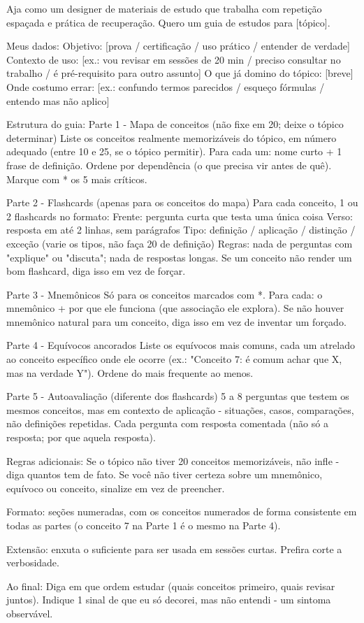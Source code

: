 \documentclass[11pt, a4paper]{article}
\begin{document}
\begin{promptbox}
Aja como um designer de materiais de estudo que trabalha com repetição espaçada e prática de recuperação. Quero um guia de estudos para [tópico].

Meus dados:
 Objetivo: [prova / certificação / uso prático / entender de verdade]
 Contexto de uso: [ex.: vou revisar em sessões de 20 min / preciso consultar no trabalho / é pré-requisito para outro assunto]
 O que já domino do tópico: [breve]
 Onde costumo errar: [ex.: confundo termos parecidos / esqueço fórmulas / entendo mas não aplico]

Estrutura do guia:
 Parte 1 - Mapa de conceitos (não fixe em 20; deixe o tópico determinar)
  Liste os conceitos realmente memorizáveis do tópico, em número adequado (entre 10 e 25, se o tópico permitir). Para cada um: nome curto + 1 frase de definição. Ordene por dependência (o que precisa vir antes de quê). Marque com * os 5 mais críticos.

 Parte 2 - Flashcards (apenas para os conceitos do mapa)
  Para cada conceito, 1 ou 2 flashcards no formato:
   Frente: pergunta curta que testa uma única coisa
   Verso: resposta em até 2 linhas, sem parágrafos
  Tipo: definição / aplicação / distinção / exceção (varie os tipos, não faça 20 de definição)
  Regras: nada de perguntas com "explique" ou "discuta"; nada de respostas longas. Se um conceito não render um bom flashcard, diga isso em vez de forçar.

 Parte 3 - Mnemônicos
  Só para os conceitos marcados com *. Para cada: o mnemônico + por que ele funciona (que associação ele explora). Se não houver mnemônico natural para um conceito, diga isso em vez de inventar um forçado.

 Parte 4 - Equívocos ancorados
  Liste os equívocos mais comuns, cada um atrelado ao conceito específico onde ele ocorre (ex.: "Conceito 7: é comum achar que X, mas na verdade Y"). Ordene do mais frequente ao menos.

 Parte 5 - Autoavaliação (diferente dos flashcards)
  5 a 8 perguntas que testem os mesmos conceitos, mas em contexto de aplicação - situações, casos, comparações, não definições repetidas. Cada pergunta com resposta comentada (não só a resposta; por que aquela resposta).

Regras adicionais:
 Se o tópico não tiver 20 conceitos memorizáveis, não infle - diga quantos tem de fato.
 Se você não tiver certeza sobre um mnemônico, equívoco ou conceito, sinalize em vez de preencher.

Formato: seções numeradas, com os conceitos numerados de forma consistente em todas as partes (o conceito 7 na Parte 1 é o mesmo na Parte 4).

Extensão: enxuta o suficiente para ser usada em sessões curtas. Prefira corte a verbosidade.

Ao final:
 Diga em que ordem estudar (quais conceitos primeiro, quais revisar juntos).
 Indique 1 sinal de que eu só decorei, mas não entendi - um sintoma observável.
\end{promptbox}
\end{document}
